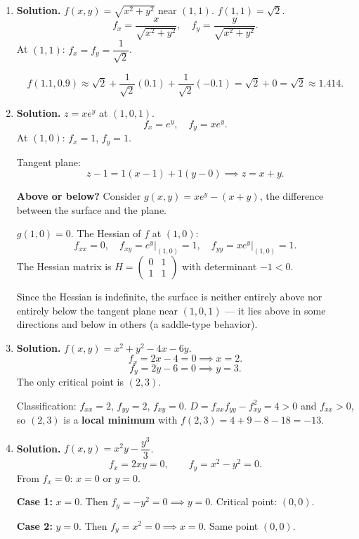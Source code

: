 \begin{enumerate}
\item \textbf{Solution.}
$f(x,y) = \sqrt{x^2+y^2}$ near $(1,1)$. $f(1,1) = \sqrt{2}$.
\[
f_x = \frac{x}{\sqrt{x^2+y^2}}, \quad f_y = \frac{y}{\sqrt{x^2+y^2}}.
\]
At $(1,1)$: $f_x = f_y = \dfrac{1}{\sqrt{2}}$.

\[
f(1.1, 0.9) \approx \sqrt{2} + \frac{1}{\sqrt{2}}(0.1) + \frac{1}{\sqrt{2}}(-0.1) = \sqrt{2} + 0 = \boxed{\sqrt{2} \approx 1.414}.
\]

\item \textbf{Solution.}
$z = xe^y$ at $(1,0,1)$.
\[
f_x = e^y, \quad f_y = xe^y.
\]
At $(1,0)$: $f_x = 1$, $f_y = 1$.

Tangent plane:
\[
z - 1 = 1(x-1) + 1(y - 0) \implies \boxed{z = x + y}.
\]

\textbf{Above or below?} Consider $g(x,y) = xe^y - (x+y)$, the difference between the surface and the plane.

$g(1,0) = 0$. The Hessian of $f$ at $(1,0)$:
\[
f_{xx} = 0, \quad f_{xy} = e^y\big|_{(1,0)} = 1, \quad f_{yy} = xe^y\big|_{(1,0)} = 1.
\]
The Hessian matrix is $H = \begin{pmatrix} 0 & 1 \\ 1 & 1\end{pmatrix}$ with determinant $-1 < 0$.

Since the Hessian is indefinite, the surface is neither entirely above nor entirely below the tangent plane near $(1,0,1)$ --- it lies above in some directions and below in others (a saddle-type behavior).


\item \textbf{Solution.}
$f(x,y) = x^2 + y^2 - 4x - 6y$.
\[
f_x = 2x - 4 = 0 \implies x = 2.
\]
\[
f_y = 2y - 6 = 0 \implies y = 3.
\]
The only critical point is $\boxed{(2, 3)}$.

Classification: $f_{xx} = 2$, $f_{yy} = 2$, $f_{xy} = 0$. $D = f_{xx}f_{yy} - f_{xy}^2 = 4 > 0$ and $f_{xx} > 0$, so $(2,3)$ is a \textbf{local minimum} with $f(2,3) = 4 + 9 - 8 - 18 = -13$.

\item \textbf{Solution.}
$f(x,y) = x^2y - \dfrac{y^3}{3}$.
\[
f_x = 2xy = 0, \qquad f_y = x^2 - y^2 = 0.
\]
From $f_x = 0$: $x = 0$ or $y = 0$.

\textbf{Case 1:} $x = 0$. Then $f_y = -y^2 = 0 \implies y = 0$. Critical point: $(0,0)$.

\textbf{Case 2:} $y = 0$. Then $f_y = x^2 = 0 \implies x = 0$. Same point $(0,0)$.


\end{enumerate}
